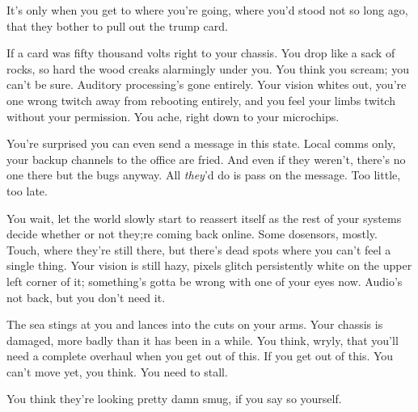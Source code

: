 It's only when you get to where you're going, where you'd stood not so long ago, that they bother to pull out the trump card. 

If a card was fifty thousand volts right to your chassis. You drop like a sack of rocks, so hard the wood creaks alarmingly under you. You think you scream; you can't be sure. Auditory processing's gone entirely. Your vision whites out, you're one wrong twitch away from rebooting entirely, and you feel your limbs twitch without your permission. You ache, right down to your microchips. 


You're surprised you can even send a message in this state. Local comms only, your backup channels to the office are fried. And even if they weren't, there's no one there but the bugs anyway. All \emph{they}'d do is pass on the message. Too little, too late.

You wait, let the world slowly start to reassert itself as the rest of your systems decide whether or not they;re coming back online. Some do\textemdash sensors, mostly. Touch, where they're still there, but there's dead spots where you can't feel a single thing. Your vision is still hazy, pixels glitch persistently white on the upper left corner of it; something's gotta be wrong with one of your eyes now. Audio's not back, but you don't need it. 

The sea stings at you and lances into the cuts on your arms. Your chassis is damaged, more badly than it has been in a while. You think, wryly, that you'll need a complete overhaul when you get out of this. If you get out of this. You can't move yet, you think. You need to stall.


You think they're looking pretty damn smug, if you say so yourself. 


